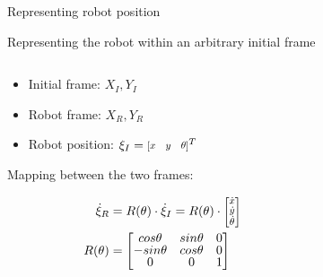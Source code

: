 \documentclass[compress]{beamer}
\newcommand{\colvec}[2][.8]{%
  \scalebox{#1}{%
    \renewcommand{\arraystretch}{.8}%
    $\begin{bmatrix}#2\end{bmatrix}$%
  }
}
\begin{document}
\begin{frame}{Representing robot position}

Representing the robot within an arbitrary initial frame

    \begin{columns}
        \begin{column}{0.6\linewidth}
\begin{itemize}
    \item Initial frame: ${X_I, Y_I}$
    \item Robot frame: ${X_R, Y_R}$
    \item Robot position: $\xi_I = \colvec{x & y & \theta}^T$
\end{itemize}

            \vspace{1em}

Mapping between the two frames:

    \begin{align*}
        \dot\xi_R &= R(\theta)\cdot \dot\xi_I = R(\theta)\cdot \colvec{\dot{x} \\ \dot{y} \\ \dot\theta} \\ 
        R(\theta) &= \begin{bmatrix} cos\theta & sin\theta & 0 \\
                                    -sin\theta & cos\theta & 0 \\
                                             0 &         0 & 1 \end{bmatrix}
    \end{align*}

            
        \end{column}
        \begin{column}{0.4\linewidth}


\end{column}
\end{columns}
\end{frame}
\end{document}
